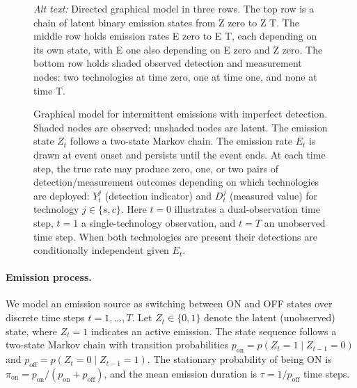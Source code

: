 \documentclass[numsec,webpdf,modern,mediumone]{oup-authoring-template}
\begin{document}
\begin{figure}[htbp]
\begin{tikzpicture}
\end{tikzpicture}
\caption{Graphical model for intermittent emissions with imperfect detection. Shaded nodes are observed; unshaded nodes are latent. The emission state $Z_t$ follows a two-state Markov chain. The emission rate $E_t$ is drawn at event onset and persists until the event ends. At each time step, the true rate may produce zero, one, or two pairs of detection/measurement outcomes depending on which technologies are deployed: $Y_t^j$ (detection indicator) and $D_t^j$ (measured value) for technology $j \in \{s, c\}$. Here $t = 0$ illustrates a dual-observation time step, $t = 1$ a single-technology observation, and $t = T$ an unobserved time step. When both technologies are present their detections are conditionally independent given $E_t$.}
\par\smallskip
{\small\textit{Alt text:} Directed graphical model in three rows. The top row is a chain of latent binary emission states from Z zero to Z T. The middle row holds emission rates E zero to E T, each depending on its own state, with E one also depending on E zero and Z zero. The bottom row holds shaded observed detection and measurement nodes: two technologies at time zero, one at time one, and none at time T.}
\label{fig:model_overview}
\end{figure}

\paragraph{Emission process.}
We model an emission source as switching between ON and OFF states over discrete time steps $t = 1, \ldots, T$. Let $Z_t \in \{0, 1\}$ denote the latent (unobserved) state, where $Z_t = 1$ indicates an active emission. The state sequence follows a two-state Markov chain with transition probabilities $p_{\text{on}} = p(Z_t = 1 \mid Z_{t-1} = 0)$ and $p_{\text{off}} = p(Z_t = 0 \mid Z_{t-1} = 1)$. The stationary probability of being ON is $\pi_{\text{on}} = p_{\text{on}} / (p_{\text{on}} + p_{\text{off}})$, and the mean emission duration is $\tau = 1/p_{\text{off}}$ time steps.
\end{document}
